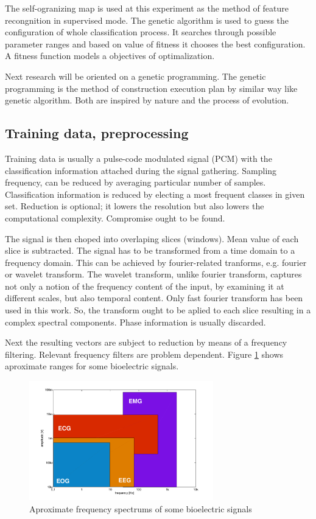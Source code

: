 \documentclass[a4paper,jurnal]{IEEEtran}
\begin{document}
The self-ogranizing map is used  at this experiment as the method of feature recongnition in 
supervised mode. The genetic algorithm is used to guess the configuration of 
whole classification process. It searches through possible parameter ranges and 
based on value of fitness it chooses the best configuration. A fitness function
models a objectives of optimalization.

Next research will be oriented on a genetic programming. The genetic programming 
is the method of construction execution plan by similar way like genetic
algorithm. Both are inspired by nature and the process of evolution.


\subsection{Training data, preprocessing}
Training data is usually a pulse-code modulated signal (PCM) \cite{pcm} with the
classification information attached during the signal gathering.
Sampling frequency,
can be reduced by averaging particular number of samples. Classification
information is reduced by electing a most frequent classes in given set.
Reduction is optional; it lowers the resolution but also lowers the 
computational complexity. Compromise ought to be found.

The signal is then choped into overlaping slices (windows). 
Mean value of each slice is subtracted. %
The signal has to be transformed %
from a time domain to a frequency domain.
This can be achieved by fourier-related tranforms, e.g. fourier or wavelet transform\cite{fourier,wavelet}.
The wavelet transform, unlike fourier transform, captures not only a notion of the 
frequency content of the input,
by examining it at different scales, but also temporal content.
Only fast fourier transform has been used in this work.
So, the transform ought to be aplied to each slice resulting in
a complex spectral components.
Phase information is usually discarded.

Next the resulting vectors are subject to reduction by means of a
frequency filtering. Relevant frequency filters are problem dependent.
Figure \ref{filters2} shows aproximate ranges for some bioelectric signals.
\begin{figure}[h]
	\centering
	\includegraphics[width=80mm]{filters2}
	\caption{Aproximate frequency spectrums of some bioelectric signals}
	\label{filters2}
\end{figure}
\end{document}
